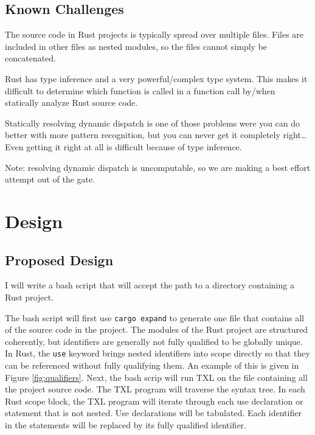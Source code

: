 \documentclass[11pt]{article}
\begin{document}
\subsection{Known Challenges}

The source code in Rust projects is typically spread over multiple files.
Files are included in other files as nested modules, so the files cannot simply be concatenated.

Rust has type inference and a very powerful/complex type system.
This makes it difficult to determine which function is called in a function call by/when statically analyze Rust source code.

Statically resolving dynamic dispatch is one of those problems were you can do better with more pattern recognition, but you can never get it completely right\dots
Even getting it right at all is difficult because of type inference.

Note: resolving dynamic dispatch is uncomputable, so we are making a best effort attempt out of the gate.


\section{Design}

\subsection{Proposed Design}

I will write a bash script that will accept the path to a directory containing a Rust project.

The bash script will first use \lstinline{cargo expand} to generate one file that contains all of the source code in the project.
The modules of the Rust project are structured coherently, but identifiers are generally not fully qualified to be globally unique.
In Rust, the \lstinline{use} keyword brings nested identifiers into scope directly so that they can be referenced without fully qualifying them.
An example of this is given in Figure \ref{fig:qualifiers}.
Next, the bash scrip will run TXL on the file containing all the project source code.
The TXL program will traverse the syntax tree.
In each Rust scope block, the TXL program will iterate through each use declaration or statement that is not nested.
Use declarations will be tabulated.
Each identifier in the statements will be replaced by its fully qualified identifier.
\end{document}

